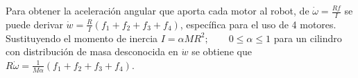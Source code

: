 \documentclass[twocolumn,10pt]{amrob}
\begin{document}

Para obtener la aceleración angular que aporta cada motor al robot, de \(\dot{\omega} = \frac{Rf}{I}\) se puede derivar $\dot{w} =\frac{R}{I}\left(f_1+f_2+f_3+f_4\right)$, específica para el uso de 4 motores. Sustituyendo el momento de inercia $I = \alpha M R^{2} ;\qquad 0\leq \alpha \leq1$ para un cilindro con distribución de masa desconocida en $\dot{w}$  se obtiene que $R\dot{\omega} = \frac{1}{M\alpha}\left(f_1+f_2+f_3+f_4\right)$. \par
\end{document}
